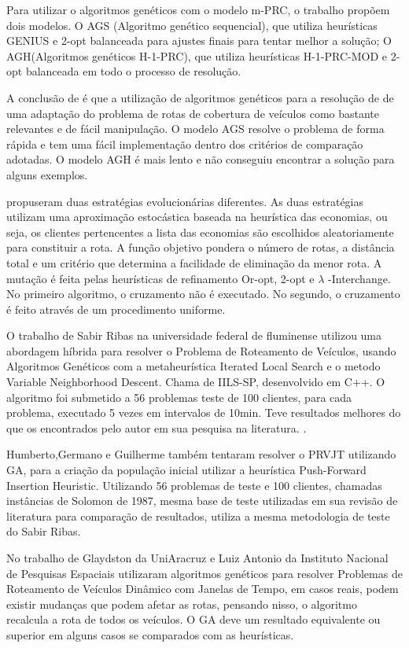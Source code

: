 Para utilizar o algoritmos genéticos com o modelo m-PRC, o trabalho propõem dois modelos. O AGS (Algoritmo genético sequencial), que utiliza heurísticas GENIUS e 2-opt balanceada para ajustes finais para tentar melhor a solução; O AGH(Algoritmos genéticos H-1-PRC), que utiliza heurísticas H-1-PRC-MOD e 2-opt balanceada em todo o processo de resolução.

A conclusão de \cite{Washington} é que a utilização de algoritmos genéticos para a resolução de de uma adaptação do problema de rotas de cobertura de veículos como bastante relevantes e de fácil manipulação. O modelo AGS resolve o problema de forma rápida e tem uma fácil implementação dentro dos critérios de comparação adotadas. O modelo AGH é mais lento e não conseguiu encontrar a solução para alguns exemplos.

\cite{HOMBERGER} propuseram duas estratégias evolucionárias diferentes. As duas estratégias utilizam uma aproximação estocástica baseada na heurística das economias, ou seja, os clientes pertencentes a lista das economias são escolhidos aleatoriamente para constituir a rota. A função objetivo pondera o número de rotas, a distância total e um critério que determina a facilidade de eliminação da menor rota. 
A mutação é feita pelas heurísticas de refinamento Or-opt, 2-opt\* e $\lambda$ -Interchange. No primeiro algoritmo, o cruzamento não é executado. No segundo, o cruzamento é feito através de um procedimento uniforme.

O trabalho de Sabir Ribas na universidade federal de fluminense utilizou uma abordagem híbrida para resolver o Problema de Roteamento de Veículos, usando Algoritmos Genéticos com a metaheurística Iterated Local Search e o metodo Variable Neighborhood Descent. Chama de IILS-SP, desenvolvido em C++. O algoritmo foi submetido a 56 problemas teste de 100 clientes, para cada problema, executado 5 vezes em intervalos de 10min. Teve resultados melhores do que os encontrados pelo autor em sua pesquisa na literatura. \cite{SABIRRIBAS}.

Humberto,Germano e Guilherme também tentaram resolver o PRVJT utilizando GA, para a criação da população inicial utilizar a heurística Push-Forward Insertion Heuristic. Utilizando 56 problemas de teste e 100 clientes, chamadas instâncias de Solomon de 1987, mesma base de teste utilizadas em sua revisão de literatura para comparação de resultados, utiliza a mesma metodologia de teste do Sabir Ribas. \cite{HGGUILHERME}

No trabalho de Glaydston da UniAracruz e Luiz Antonio da Instituto Nacional de Pesquisas Espaciais utilizaram algoritmos genéticos para resolver Problemas de Roteamento de Veículos Dinâmico com Janelas de Tempo, em casos reais, podem existir mudanças que podem afetar as rotas, pensando nisso, o algoritmo recalcula a rota de todos os veículos. O GA deve um resultado equivalente ou superior em alguns casos se comparados com as heurísticas. \cite{GLAYDSTON}

